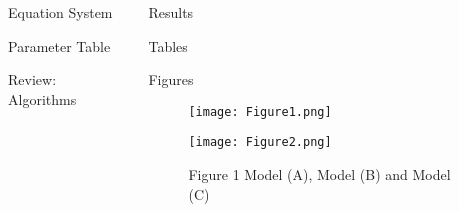 \begin{frame}[t]
\begin{columns}[t]
\begin{column}{\onecolwid}
\begin{alertblock}{Equation System}
\end{alertblock}
\begin{alertblock}{Parameter Table}
\end{alertblock}
\begin{alertblock}{Review: Algorithms}
\end{alertblock}
\end{column}
\begin{column}{\onecolwid} %
\begin{alertblock}{Results}
\end{alertblock}
\begin{alertblock}{Tables}
\end{alertblock}
\begin{alertblock}{Figures}
\begin{figure}[H]
	\centering
	\begin{minipage}[b]{0.5\linewidth}
		\texttt{[image: Figure1.png]}
	\end{minipage}\hfill
	\begin{minipage}[b]{0.5\linewidth}
		\texttt{[image: Figure2.png]}
	\end{minipage}\hfill
	\caption{Figure 1 Model (A), Model (B) and Model (C)}
	\label{fig:Figure1}
\end{figure}
\end{alertblock}

\end{column}
\end{columns}
\end{frame}
